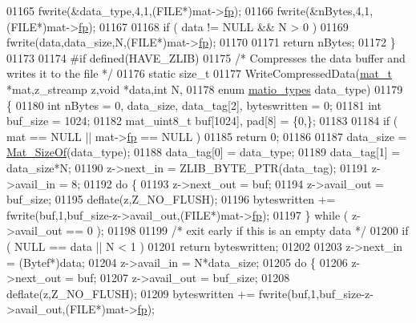\begin{DoxyCode}
{{{{01165     fwrite(&data\_type,4,1,(FILE*)mat->\hyperlink{struct__mat__t_a85f562e407ca9ad4d2a6e14f839432b7}{fp});
01166     fwrite(&nBytes,4,1,(FILE*)mat->\hyperlink{struct__mat__t_a85f562e407ca9ad4d2a6e14f839432b7}{fp});
01167 
01168     \textcolor{keywordflow}{if} ( data != NULL && N > 0 )
01169         fwrite(data,data\_size,N,(FILE*)mat->\hyperlink{struct__mat__t_a85f562e407ca9ad4d2a6e14f839432b7}{fp});
01170 
01171     \textcolor{keywordflow}{return} nBytes;
01172 \}
01173 
01174 \textcolor{preprocessor}{#if defined(HAVE\_ZLIB)}
01175 \textcolor{comment}{/* Compresses the data buffer and writes it to the file */}
01176 \textcolor{keyword}{static} \textcolor{keywordtype}{size\_t}
01177 WriteCompressedData(\hyperlink{struct__mat__t}{mat\_t} *mat,z\_streamp z,\textcolor{keywordtype}{void} *data,\textcolor{keywordtype}{int} N,
01178     \textcolor{keyword}{enum} \hyperlink{group___m_a_t_gacf7b3b879282b7ab3a51190e49bf3453}{matio\_types} data\_type)
01179 \{
01180     \textcolor{keywordtype}{int} nBytes = 0, data\_size, data\_tag[2], byteswritten = 0;
01181     \textcolor{keywordtype}{int} buf\_size = 1024;
01182     mat\_uint8\_t buf[1024], pad[8] = \{0,\};
01183 
01184     \textcolor{keywordflow}{if} ( mat == NULL || mat->\hyperlink{struct__mat__t_a85f562e407ca9ad4d2a6e14f839432b7}{fp} == NULL )
01185         \textcolor{keywordflow}{return} 0;
01186 
01187     data\_size   = \hyperlink{group__mat__util_gab6774aabdc124c540c1e7686d0804940}{Mat\_SizeOf}(data\_type);
01188     data\_tag[0] = data\_type;
01189     data\_tag[1] = data\_size*N;
01190     z->next\_in  = ZLIB\_BYTE\_PTR(data\_tag);
01191     z->avail\_in = 8;
01192     \textcolor{keywordflow}{do} \{
01193         z->next\_out  = buf;
01194         z->avail\_out = buf\_size;
01195         deflate(z,Z\_NO\_FLUSH);
01196         byteswritten += fwrite(buf,1,buf\_size-z->avail\_out,(FILE*)mat->\hyperlink{struct__mat__t_a85f562e407ca9ad4d2a6e14f839432b7}{fp});
01197     \} \textcolor{keywordflow}{while} ( z->avail\_out == 0 );
01198 
01199     \textcolor{comment}{/* exit early if this is an empty data */}
01200     \textcolor{keywordflow}{if} ( NULL == data || N < 1 )
01201         \textcolor{keywordflow}{return} byteswritten;
01202 
01203     z->next\_in  = (Bytef*)data;
01204     z->avail\_in = N*data\_size;
01205     \textcolor{keywordflow}{do} \{
01206         z->next\_out  = buf;
01207         z->avail\_out = buf\_size;
01208         deflate(z,Z\_NO\_FLUSH);
01209         byteswritten += fwrite(buf,1,buf\_size-z->avail\_out,(FILE*)mat->\hyperlink{struct__mat__t_a85f562e407ca9ad4d2a6e14f839432b7}{fp});
}}}}
\end{DoxyCode}
